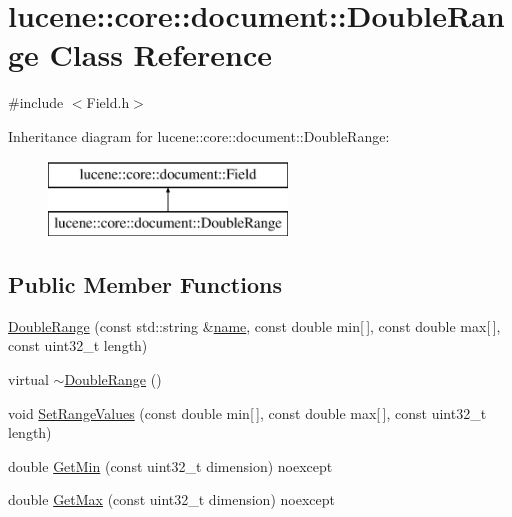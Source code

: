 \hypertarget{classlucene_1_1core_1_1document_1_1DoubleRange}{}\section{lucene\+:\+:core\+:\+:document\+:\+:Double\+Range Class Reference}
\label{classlucene_1_1core_1_1document_1_1DoubleRange}


{\ttfamily \#include $<$Field.\+h$>$}

Inheritance diagram for lucene\+:\+:core\+:\+:document\+:\+:Double\+Range\+:\begin{figure}[H]
\begin{center}
\leavevmode
\includegraphics[height=2.000000cm]{classlucene_1_1core_1_1document_1_1DoubleRange}
\end{center}
\end{figure}
\subsection*{Public Member Functions}
\begin{DoxyCompactItemize}
\item 
\mbox{\hyperlink{classlucene_1_1core_1_1document_1_1DoubleRange_ac6c5423e8f054367ecd48401865f5ab5}{Double\+Range}} (const std\+::string \&\mbox{\hyperlink{classlucene_1_1core_1_1document_1_1Field_a52f673f3b3abb14b180f5159f4726537}{name}}, const double min\mbox{[}$\,$\mbox{]}, const double max\mbox{[}$\,$\mbox{]}, const uint32\+\_\+t length)
\item 
virtual \mbox{\hyperlink{classlucene_1_1core_1_1document_1_1DoubleRange_a45fd069e037e7bc951603fe5376b1554}{$\sim$\+Double\+Range}} ()
\item 
void \mbox{\hyperlink{classlucene_1_1core_1_1document_1_1DoubleRange_a86f4a1467c114de406f39fd311675055}{Set\+Range\+Values}} (const double min\mbox{[}$\,$\mbox{]}, const double max\mbox{[}$\,$\mbox{]}, const uint32\+\_\+t length)
\item 
double \mbox{\hyperlink{classlucene_1_1core_1_1document_1_1DoubleRange_a3ca5167af09ebd334f78362c2eac2c0f}{Get\+Min}} (const uint32\+\_\+t dimension) noexcept
\item 
double \mbox{\hyperlink{classlucene_1_1core_1_1document_1_1DoubleRange_a5a68667b9d3d2687100e9b96bd729084}{Get\+Max}} (const uint32\+\_\+t dimension) noexcept
\end{DoxyCompactItemize}
